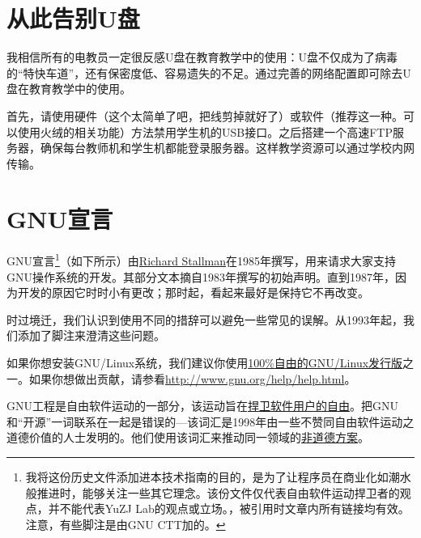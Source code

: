 \section{从此告别U盘}
我相信所有的电教员一定很反感U盘在教育教学中的使用：U盘不仅成为了病毒的“特快车道”，还有保密度低、容易遗失的不足。通过完善的网络配置即可除去U盘在教育教学中的使用。\par
首先，请使用硬件（这个太简单了吧，把线剪掉就好了）或软件（推荐这一种。可以使用火绒的相关功能）方法禁用学生机的USB接口。之后搭建一个高速FTP服务器，确保每台教师机和学生机都能登录服务器。这样教学资源可以通过学校内网传输。
\section{GNU宣言}
GNU宣言\footnote{我将这份历史文件添加进本技术指南的目的，是为了让程序员在商业化如潮水般推进时，能够关注一些其它理念。该份文件仅代表自由软件运动捍卫者的观点，并不能代表YuZJ Lab的观点或立场。\cite{gnum}，被引用时文章内所有链接均有效。注意，有些脚注是由GNU CTT加的。}（如下所示）由\href{http://www.stallman.org/}{Richard Stallman}在1985年撰写，用来请求大家支持GNU操作系统的开发。其部分文本摘自1983年撰写的初始声明。直到1987年，因为开发的原因它时时小有更改；那时起，看起来最好是保持它不再改变。\par
时过境迁，我们认识到使用不同的措辞可以避免一些常见的误解。从1993年起，我们添加了脚注来澄清这些问题。\par
如果你想安装GNU/Linux系统，我们建议你使用\href{http://www.gnu.org/distros}{100\%自由的GNU/Linux发行版}之一。如果你想做出贡献，请参看\url{http://www.gnu.org/help/help.html}。\par
GNU工程是自由软件运动的一部分，该运动旨在\href{http://www.gnu.org/philosophy/free-sw.html}{捍卫软件用户的自由}。把GNU和“开源”一词联系在一起是错误的—该词汇是1998年由一些不赞同自由软件运动之道德价值的人士发明的。他们使用该词汇来推动同一领域的\href{http://www.gnu.org/philosophy/open-source-misses-the-point.html}{非道德方案}。\par
